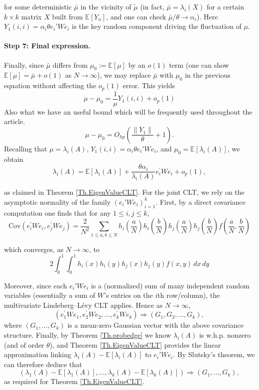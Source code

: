 \documentclass[11pt, reqno]{amsart}
\numberwithin{equation}{section}
\newcommand{\E}{\mbox{${\mathbb E}$}}
\begin{document}
    for some deterministic $\bar{\mu}$ in the vicinity of $\tilde{\mu}$ (in fact, $\bar{\mu}=\lambda_i(X)$ for a certain $k\times k$ matrix $X$ built from $\E[Y_n]$, and one can check $\bar{\mu}/\theta \to \alpha_i$). Here $Y_1(i,i) = \alpha_i\theta e_i' W e_i$ is the key random component driving the fluctuation of $\mu$.

\paragraph{\bf Step 7: Final expression.} Finally, since $\bar{\mu}$ differs from $\mu_0 := \E[\mu]$ by an $o(1)$ term (one can show $\E[\mu] = \bar{\mu} + o(1)$ as $N\to\infty$), we may replace $\bar{\mu}$ with $\mu_0$ in the previous equation without affecting the $o_p(1)$ error. This yields
   \begin{equation}
    \mu-\mu_0=\frac{1}{\mu} Y_1(i, i)+o_p(1)
    \end{equation}
Also what we have an useful bound which will be frequently used throughout the article.
\begin{equation}\label{eq:mu-mu0}
    \mu-\mu_0=O_{hp}\left(\frac{\|Y_1\|}{\theta}+1\right).
    \end{equation}
    Recalling that $\mu = \lambda_i(A)$, $Y_1(i,i)=\alpha_i\theta e_i' W e_i$, and $\mu_0=\E[\lambda_i(A)]$, we obtain
   \[
   \lambda_i(A)=\E\left[\lambda_i(A)\right]+\frac{\theta \alpha_i}{\lambda_i(A)} e_i^{\prime} W e_i+o_p(1),
   \]

    as claimed in Theorem \ref{Th.EigenValueCLT}.
For the joint CLT, we rely on the asymptotic normality of the family $(e_i' W e_i)_{i=1}^k$. First, by a direct covariance computation one finds that for any $1\le i,j \le k$,
\[
\mathrm{Cov}\left(e_i^\prime We_i,e_j^\prime We_j\right)= \frac{2}{N^2}\sum_{1\le a, b\le N}h_i\left(\frac {a}{N}\right)h_i\left(\frac {b}{N}\right)h_j\left(\frac {a}{N}\right)h_j\left(\frac {b}{N}\right)f\left(\frac{a}{N},\frac{b}{N}\right)
\]

which converges, as $N\to\infty$, to
\[
2\int_0^1\int_0^1h_i(x)h_i(y)h_j(x)h_j(y)f(x,y)\,dx\,dy
\]

Moreover, since each $e_i' W e_i$ is a (normalized) sum of many independent random variables (essentially a sum of $W$’s entries on the $i$th row/column), the multivariate Lindeberg–Lévy CLT applies. Hence as $N\to\infty$,
\[
\left(e_1^{\prime} W e_1, e_2^{\prime} W e_2, \ldots, e_k^{\prime} W e_k\right) \Rightarrow\left(G_1, G_2, \ldots, G_k\right),
\]
where $(G_1,\ldots,G_k)$ is a mean-zero Gaussian vector with the above covariance structure. Finally, by Theorem \ref{Th.probedge} we know $\lambda_i(A)$ is w.h.p. nonzero (and of order $\theta$), and Theorem \ref{Th.EigenValueCLT} provides the linear approximation linking $\lambda_i(A) - \E[\lambda_i(A)]$ to $e_i' W e_i$. By Slutsky’s theorem, we can therefore deduce that
\[
\left(\lambda_1(A)-\E\left[\lambda_1(A)\right], \ldots, \lambda_k(A)-\E\left[\lambda_k(A)\right]\right) \Rightarrow\left(G_1, \ldots, G_k\right),
\]
as required for Theorem \ref{Th.EigenValueCLT}.
\end{document}
